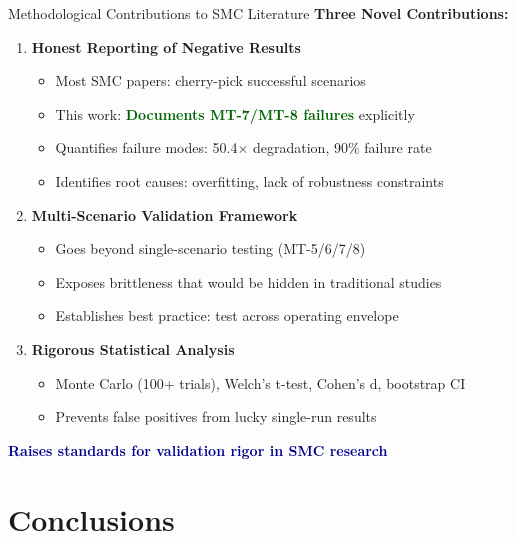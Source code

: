 \documentclass[10pt,aspectratio=169]{beamer}
\newcommand{\highlight}[1]{\textcolor{darkblue}{\textbf{#1}}}
\newcommand{\emphgreen}[1]{\textcolor{darkgreen}{\textbf{#1}}}
\begin{document}
\begin{frame}{Methodological Contributions to SMC Literature}
\textbf{Three Novel Contributions:}

\begin{enumerate}
    \item \textbf{Honest Reporting of Negative Results}
    \begin{itemize}
        \item Most SMC papers: cherry-pick successful scenarios
        \item This work: \emphgreen{Documents MT-7/MT-8 failures} explicitly
        \item Quantifies failure modes: 50.4$\times$ degradation, 90\% failure rate
        \item Identifies root causes: overfitting, lack of robustness constraints
    \end{itemize}

    \item \textbf{Multi-Scenario Validation Framework}
    \begin{itemize}
        \item Goes beyond single-scenario testing (MT-5/6/7/8)
        \item Exposes brittleness that would be hidden in traditional studies
        \item Establishes best practice: test across operating envelope
    \end{itemize}

    \item \textbf{Rigorous Statistical Analysis}
    \begin{itemize}
        \item Monte Carlo (100+ trials), Welch's t-test, Cohen's d, bootstrap CI
        \item Prevents false positives from lucky single-run results
    \end{itemize}
\end{enumerate}

\vspace{0.3cm}
\centering
\highlight{Raises standards for validation rigor in SMC research}
\end{frame}

\section{Conclusions}
\end{document}
